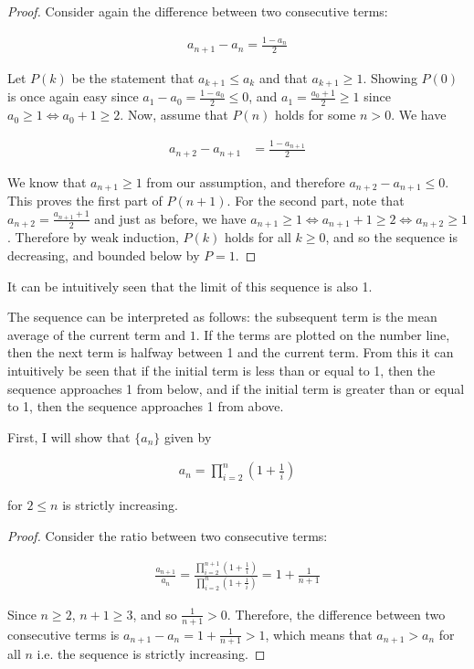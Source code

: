 \begin{proof}
  Consider again the difference between two consecutive terms:

  \begin{align*}
    a_{n + 1} - a_n = \frac{1 - a_n}{2}
  \end{align*}

  Let $P(k)$ be the statement that $a_{k + 1} \leq a_k$ and that $a_{k + 1} \geq 1$. Showing $P(0)$ is once again easy since $a_1 - a_0 = \frac{1 - a_0}{2} \leq 0$, and $a_1 = \frac{a_0 + 1}{2} \geq 1$ since $a_0 \geq 1 \iff a_0 + 1 \geq 2$. Now, assume that $P(n)$ holds for some $n > 0$. We have

  \begin{align*}
    a_{n + 2} - a_{n + 1} &= \frac{1 - a_{n + 1}}{2}
  \end{align*}

  We know that $a_{n + 1} \geq 1$ from our assumption, and therefore $a_{n + 2} - a_{n + 1} \leq 0$. This proves the first part of $P(n + 1)$. For the second part, note that $a_{n + 2} = \frac{a_{n + 1} + 1}{2}$ and just as before, we have $a_{n + 1} \geq 1 \iff a_{n + 1} + 1 \geq 2 \iff a_{n + 2} \geq 1$. Therefore by weak induction, $P(k)$ holds for all $k \geq 0$, and so the sequence is decreasing, and bounded below by $P = 1$.
\end{proof}

It can be intuitively seen that the limit of this sequence is also 1.

The sequence can be interpreted as follows: the subsequent term is the mean average of the current term and $1$. If the terms are plotted on the number line, then the next term is halfway between 1 and the current term. From this it can intuitively be seen that if the initial term is less than or equal to 1, then the sequence approaches 1 from below, and if the initial term is greater than or equal to 1, then the sequence approaches 1 from above.

First, I will show that $\{a_n\}$ given by

\begin{align*}
  a_n = \prod_{i = 2}^n \left(1 + \frac{1}{i}\right)
\end{align*}

for $2 \leq n$ is strictly increasing.

\begin{proof}
  Consider the ratio between two consecutive terms:

  \begin{align*}
    \frac{a_{n + 1}}{a_n} = \frac{\prod_{i = 2}^{n + 1} \left(1 + \frac{1}{i}\right)}{\prod_{i = 2}^n \left(1 + \frac{1}{i}\right)} = 1 + \frac{1}{n + 1}
  \end{align*}

  Since $n \geq 2$, $n + 1 \geq 3$, and so $\frac{1}{n + 1} > 0$. Therefore, the difference between two consecutive terms is $a_{n + 1} - a_n = 1 + \frac{1}{n + 1} > 1$, which means that $a_{n + 1} > a_n$ for all $n$ i.e. the sequence is strictly increasing.
\end{proof}

